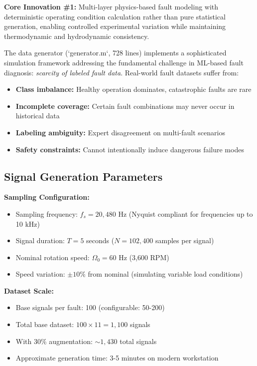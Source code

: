 \documentclass[11pt,a4paper]{article}
\begin{document}
\begin{innovation}
\textbf{Core Innovation \#1:} Multi-layer physics-based fault modeling with deterministic operating condition calculation rather than pure statistical generation, enabling controlled experimental variation while maintaining thermodynamic and hydrodynamic consistency.
\end{innovation}

The data generator (`generator.m`, 728 lines) implements a sophisticated simulation framework addressing the fundamental challenge in ML-based fault diagnosis: \textit{scarcity of labeled fault data}. Real-world fault datasets suffer from:

\begin{itemize}[leftmargin=*, itemsep=0.3em]
    \item \textbf{Class imbalance:} Healthy operation dominates, catastrophic faults are rare
    \item \textbf{Incomplete coverage:} Certain fault combinations may never occur in historical data
    \item \textbf{Labeling ambiguity:} Expert disagreement on multi-fault scenarios
    \item \textbf{Safety constraints:} Cannot intentionally induce dangerous failure modes
\end{itemize}

\subsection{Signal Generation Parameters}

\textbf{Sampling Configuration:}
\begin{itemize}[leftmargin=*, itemsep=0.2em]
    \item Sampling frequency: $f_s = 20{,}480$ Hz (Nyquist compliant for frequencies up to 10 kHz)
    \item Signal duration: $T = 5$ seconds ($N = 102{,}400$ samples per signal)
    \item Nominal rotation speed: $\Omega_0 = 60$ Hz (3,600 RPM)
    \item Speed variation: $\pm 10\%$ from nominal (simulating variable load conditions)
\end{itemize}

\textbf{Dataset Scale:}
\begin{itemize}[leftmargin=*, itemsep=0.2em]
    \item Base signals per fault: 100 (configurable: 50-200)
    \item Total base dataset: $100 \times 11 = 1{,}100$ signals
    \item With 30\% augmentation: $\sim 1{,}430$ total signals
    \item Approximate generation time: 3-5 minutes on modern workstation
\end{itemize}
\end{document}

